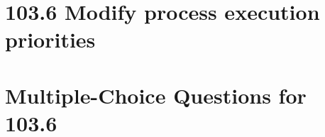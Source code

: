 \documentclass[a4paper]{report}
\begin{document}

\newpage
\section*{103.6 Modify process execution priorities}



\newpage
\section*{Multiple-Choice Questions for 103.6}
\end{document}
